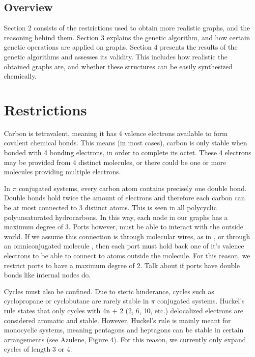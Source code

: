 \documentclass[12pt]{article}
\begin{document}
\subsection{Overview}

Section 2 consists of the restrictions used to obtain more realistic graphs, and the reasoning behind them. Section 3 explains the genetic algorithm, and how certain genetic operations are applied on graphs. Section 4 presents the results of the genetic algorithms and assesses its validity. This includes how realistic the obtained graphs are, and whether these structures can be easily synthesized chemically. %

\section{Restrictions}

Carbon is tetravalent, meaning it has 4 valence electrons available to form covalent chemical bonds. This means (in most cases), carbon is only stable when bonded with 4 bonding electrons, in order to complete its octet. These 4 electrons may be provided from 4 distinct molecules, or there could be one or more molecules providing multiple electrons.

In $\pi$ conjugated systems, every carbon atom contains precisely one double bond. Double bonds hold twice the amount of electrons and therefore each carbon can be at most connected to 3 distinct atoms. This is seen in all polycyclic polyunsaturated hydrocarbons. In this way, each node in our graphs has a maximum degree of 3. Ports however, must be able to interact with the outside world. If we assume this connection is through molecular wires, as in \cite{9}, or through an omniconjugated molecule \cite{v06}, then each port must hold back one of it's valence electrons to be able to connect to atoms outside the molecule. For this reason, we restrict ports to have a maximum degree of 2. Talk about if ports have double bonds like internal nodes do.

Cycles must also be confined. Due to steric hinderance, cycles such as cyclopropane or cyclobutane are rarely stable in $\pi$ conjugated systems. Huckel's rule states that only cycles with 4n + 2 (2, 6, 10, etc.) delocalized electrons are considered aromatic and stable. However, Huckel's rule is mainly meant for monocyclic systems, meaning pentagons and heptagons can be stable in certain arrangements (see Azulene, Figure 4). For this reason, we currently only expand cycles of length 3 or 4. 
\end{document}
